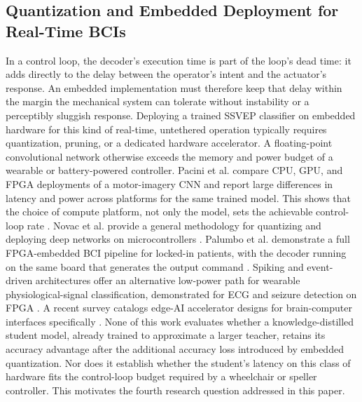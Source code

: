 \documentclass[11pt,a4paper,twoside,asymmetric]{article}
\begin{document}
\subsection{Quantization and Embedded Deployment for Real-Time BCIs}
In a control loop, the decoder's execution time is part of the loop's dead time: it adds directly to the delay between the operator's intent and the actuator's response. An embedded implementation must therefore keep that delay within the margin the mechanical system can tolerate without instability or a perceptibly sluggish response. Deploying a trained SSVEP classifier on embedded hardware for this kind of real-time, untethered operation typically requires quantization, pruning, or a dedicated hardware accelerator. A floating-point convolutional network otherwise exceeds the memory and power budget of a wearable or battery-powered controller. Pacini et al. compare CPU, GPU, and FPGA deployments of a motor-imagery CNN and report large differences in latency and power across platforms for the same trained model. This shows that the choice of compute platform, not only the model, sets the achievable control-loop rate \cite{R60}. Novac et al. provide a general methodology for quantizing and deploying deep networks on microcontrollers \cite{R63}. Palumbo et al. demonstrate a full FPGA-embedded BCI pipeline for locked-in patients, with the decoder running on the same board that generates the output command \cite{R62}. Spiking and event-driven architectures offer an alternative low-power path for wearable physiological-signal classification, demonstrated for ECG and seizure detection on FPGA \cite{R64,R65,R66,R67,R68,R69}. A recent survey catalogs edge-AI accelerator designs for brain-computer interfaces specifically \cite{R58,R61}. None of this work evaluates whether a knowledge-distilled student model, already trained to approximate a larger teacher, retains its accuracy advantage after the additional accuracy loss introduced by embedded quantization. Nor does it establish whether the student's latency on this class of hardware fits the control-loop budget required by a wheelchair or speller controller. This motivates the fourth research question addressed in this paper.
\end{document}
